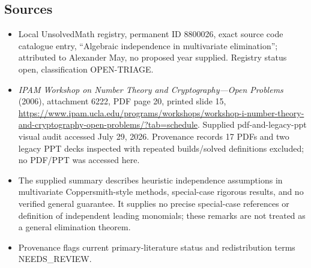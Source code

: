 \documentclass[11pt]{article}
\begin{document}
\subsection{Sources}
\begin{itemize}
\item Local UnsolvedMath registry, permanent ID 8800026, exact source code catalogue entry, ``Algebraic independence in multivariate elimination''; attributed to Alexander May, no proposed year supplied. Registry status open, classification OPEN-TRIAGE.
\item \emph{IPAM Workshop on Number Theory and Cryptography---Open Problems} (2006), attachment 6222, PDF page 20, printed slide 15, \url{https://www.ipam.ucla.edu/programs/workshops/workshop-i-number-theory-and-cryptography-open-problems/?tab=schedule}. Supplied pdf-and-legacy-ppt visual audit accessed July 29, 2026. Provenance records 17 PDFs and two legacy PPT decks inspected with repeated builds/solved definitions excluded; no PDF/PPT was accessed here.
\item The supplied summary describes heuristic independence assumptions in multivariate Coppersmith-style methods, special-case rigorous results, and no verified general guarantee. It supplies no precise special-case references or definition of independent leading monomials; these remarks are not treated as a general elimination theorem.
\item Provenance flags current primary-literature status and redistribution terms NEEDS\_REVIEW.
\end{itemize}
\end{document}
